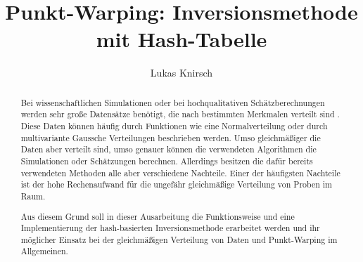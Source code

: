 \documentclass[a4paper]{IEEEtran}
\title{Punkt-Warping: Inversionsmethode mit Hash-Tabelle}
\author{Lukas Knirsch}
\begin{document}
\maketitle

\begin{abstract}
Bei wissenschaftlichen Simulationen oder bei hochqualitativen Schätzberechnungen werden sehr große Datensätze benötigt, 
die nach bestimmten Merkmalen verteilt sind \cite{frisch_hanebeck-deterministic_gaussian_sampling-2021}. Diese Daten 
können häufig durch Funktionen wie eine Normalverteilung oder durch multivariante Gaussche Verteilungen beschrieben werden. 
Umso gleichmäßiger die Daten aber verteilt sind, umso genauer können die verwendeten Algorithmen die Simulationen oder 
Schätzungen berechnen. Allerdings besitzen die dafür bereits verwendeten Methoden alle aber verschiedene Nachteile. Einer 
der häufigsten Nachteile ist der hohe Rechenaufwand für die ungefähr gleichmäßige Verteilung von Proben im Raum. 

Aus diesem Grund soll in dieser Ausarbeitung die Funktionsweise und eine Implementierung der hash-basierten 
Inversionsmethode erarbeitet werden und ihr möglicher Einsatz bei der gleichmäßigen Verteilung von Daten und Punkt-Warping 
im Allgemeinen.
\end{abstract}

















\end{document}
